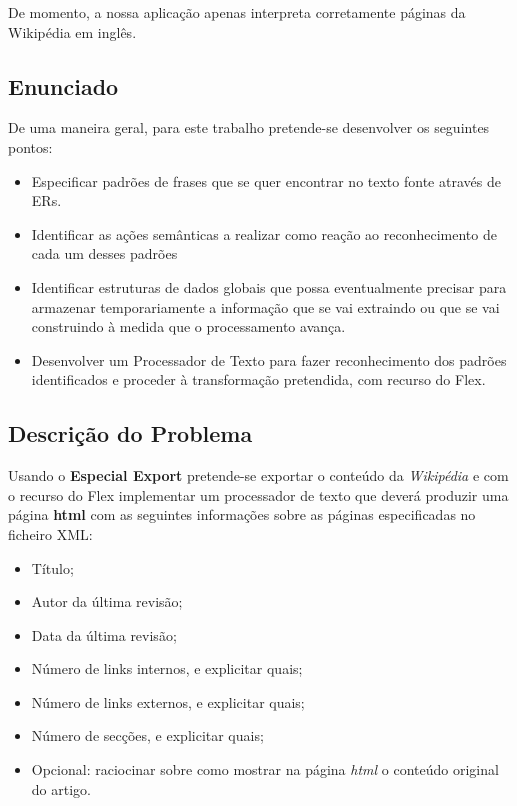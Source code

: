 \documentclass[11pt, a4paper, oneside]{article}
\begin{document}
De momento, a nossa aplicação apenas interpreta corretamente páginas da Wikipédia em inglês.
\newpage

\subsection{Enunciado}

De uma maneira geral, para este trabalho pretende-se desenvolver os seguintes pontos:
\begin{itemize}
\item Especificar padrões de frases que se quer encontrar no texto fonte através de ERs.
\item Identificar as ações semânticas a realizar como reação ao reconhecimento de cada um desses padrões
\item Identificar estruturas de dados globais que possa eventualmente precisar para armazenar temporariamente a informação que se vai extraindo ou que se vai construindo à medida que o processamento avança.
\item Desenvolver um Processador de Texto para fazer reconhecimento dos padrões identificados e proceder à transformação pretendida, com recurso do Flex.
\end{itemize}

\subsection{Descrição do Problema}

Usando o \textbf{Especial Export} pretende-se exportar o conteúdo da \textit{Wikipédia} e com o recurso do Flex implementar um processador de texto que deverá produzir uma página \textbf{html} com as seguintes informações sobre as páginas especificadas no ficheiro XML:

\begin{itemize}
\item Título;
\item Autor da última revisão;
\item Data da última revisão;
\item Número de links internos, e explicitar quais;
\item Número de links externos, e explicitar quais;
\item Número de secções, e explicitar quais;
\item Opcional: raciocinar sobre como mostrar na página \textit{html} o conteúdo original do artigo.
\end{itemize}
\end{document}
